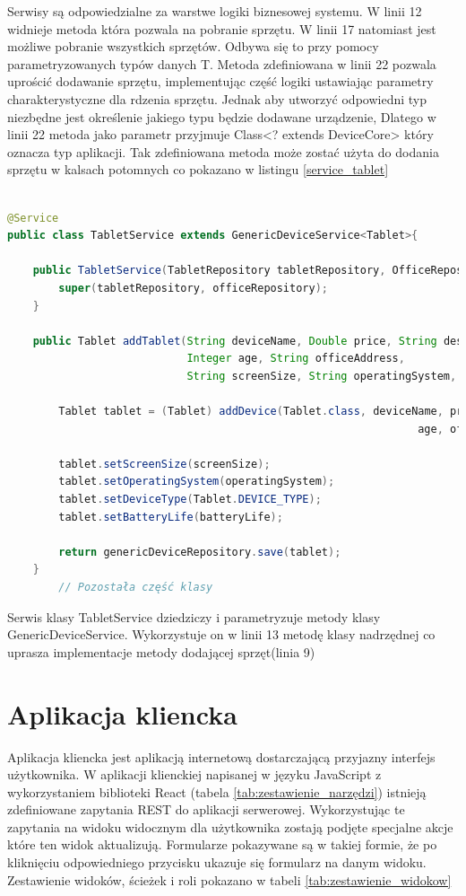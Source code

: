 Serwisy są odpowiedzialne za warstwe logiki biznesowej systemu. W linii 12 widnieje metoda która pozwala na pobranie sprzętu. W linii 17 natomiast jest możliwe pobranie wszystkich sprzętów. Odbywa się to przy pomocy parametryzowanych typów danych T. Metoda zdefiniowana w linii 22 pozwala uprościć dodawanie sprzętu, implementując część logiki ustawiając parametry charakterystyczne dla rdzenia sprzętu. Jednak aby utworzyć odpowiedni typ niezbędne jest określenie jakiego typu będzie dodawane urządzenie, Dlatego w linii 22 metoda jako parametr przyjmuje Class<? extends DeviceCore> który oznacza typ aplikacji. Tak zdefiniowana metoda może zostać użyta do dodania sprzętu w kalsach potomnych co pokazano w listingu \ref{service_tablet}

\begin{lstlisting}[language=Java, style=JavaStyle,  caption={Klasa potomna serwisu tabletu: TabletService }, label={service_tablet}]

@Service
public class TabletService extends GenericDeviceService<Tablet>{

    public TabletService(TabletRepository tabletRepository, OfficeRepository officeRepository){
        super(tabletRepository, officeRepository);
    }

    public Tablet addTablet(String deviceName, Double price, String description,
                            Integer age, String officeAddress,
                            String screenSize, String operatingSystem, String batteryLife){

        Tablet tablet = (Tablet) addDevice(Tablet.class, deviceName, price, description,
                                                                age, officeAddress);

        tablet.setScreenSize(screenSize);
        tablet.setOperatingSystem(operatingSystem);
        tablet.setDeviceType(Tablet.DEVICE_TYPE);
        tablet.setBatteryLife(batteryLife);

        return genericDeviceRepository.save(tablet);
    }
		// Pozostała część klasy
\end{lstlisting}

Serwis klasy TabletService dziedziczy i parametryzuje metody klasy GenericDeviceService. Wykorzystuje on w linii 13 metodę klasy nadrzędnej co uprasza implementacje metody dodającej sprzęt(linia 9)



\section {Aplikacja kliencka}
Aplikacja kliencka jest aplikacją internetową dostarczającą przyjazny interfejs użytkownika. W aplikacji klienckiej napisanej w języku JavaScript z wykorzystaniem biblioteki React (tabela \ref{tab:zestawienie_narzędzi}) istnieją zdefiniowane zapytania REST do aplikacji serwerowej. Wykorzystując te zapytania na widoku widocznym dla użytkownika zostają podjęte specjalne akcje które ten widok aktualizują. Formularze pokazywane są w takiej formie, że po kliknięciu odpowiedniego przycisku ukazuje się formularz na danym widoku. Zestawienie widoków, ścieżek i roli pokazano w tabeli \ref{tab:zestawienie_widokow}

